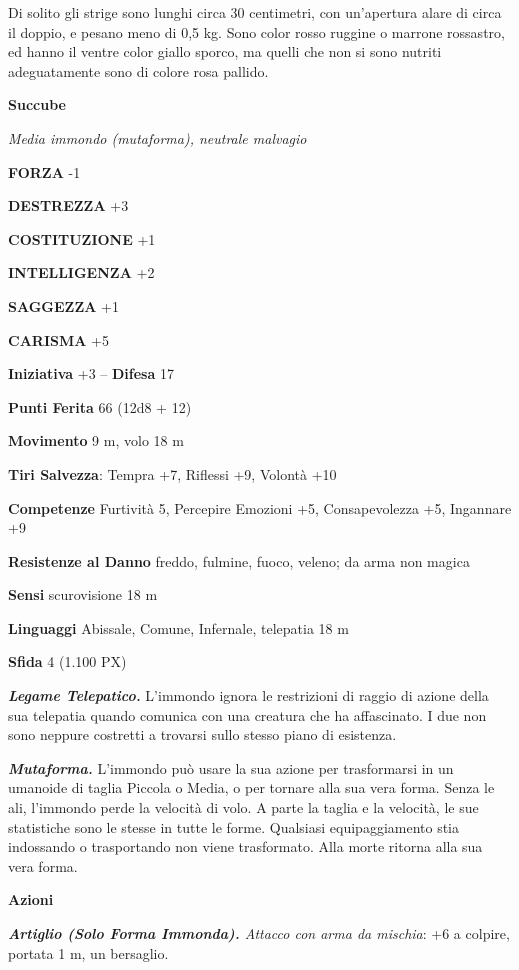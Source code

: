 \begin{multicols}{2}
	Di solito gli strige sono lunghi circa 30 centimetri, con un'apertura alare di circa il doppio, e pesano meno di 0,5 kg. Sono color rosso ruggine o marrone rossastro, ed hanno il ventre color giallo sporco, ma quelli che non si sono nutriti adeguatamente sono di colore rosa pallido.

	\medskip{}\textbf{Succube}

	\textit{Media immondo (mutaforma), neutrale malvagio}

	\textbf{FORZA} -1

	\textbf{DESTREZZA} +3

	\textbf{COSTITUZIONE} +1

	\textbf{INTELLIGENZA} +2

	\textbf{SAGGEZZA} +1

	\textbf{CARISMA} +5

	\textbf{Iniziativa} +3 -- \textbf{Difesa} 17

	\textbf{Punti Ferita} 66 (12d8 + 12)

	\textbf{Movimento} 9 m, volo 18 m

	\textbf{Tiri Salvezza}: Tempra +7, Riflessi +9, Volontà +10

	\textbf{Competenze} Furtività 5, Percepire Emozioni +5, Consapevolezza +5, Ingannare +9

	\textbf{Resistenze al Danno} freddo, fulmine, fuoco, veleno; da arma non magica

	\textbf{Sensi} scurovisione 18 m

	\textbf{Linguaggi} Abissale, Comune, Infernale, telepatia 18 m

	\textbf{Sfida} 4 (1.100 PX)

	\textit{\textbf{Legame Telepatico.}} L'immondo ignora le restrizioni di raggio di azione della sua telepatia quando comunica con una creatura che ha affascinato. I due non sono neppure costretti a trovarsi sullo stesso piano di esistenza.

	\textit{\textbf{Mutaforma.}} L'immondo può usare la sua azione per trasformarsi in un umanoide di taglia Piccola o Media, o per tornare alla sua vera forma. Senza le ali, l'immondo perde la velocità di volo. A parte la taglia e la velocità, le sue statistiche sono le stesse in tutte le forme. Qualsiasi equipaggiamento stia indossando o trasportando non viene trasformato. Alla morte ritorna alla sua vera forma.

	\textbf{Azioni}

	\textit{\textbf{Artiglio (Solo Forma Immonda).} Attacco con arma da mischia}: +6 a colpire, portata 1 m, un bersaglio.


\end{multicols}
